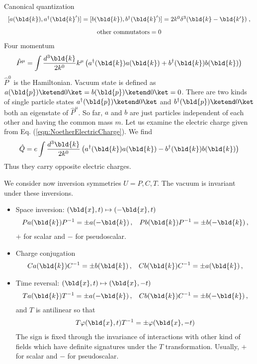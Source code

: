 Canonical quantization
\begin{equation}
\begin{array}{c}
[ a(\bld{k}), a^\dagger(\bld{k}')] = 
[ b(\bld{k}), b^\dagger(\bld{k}')] = 
2k^0\delta^3 (\bld{k} - \bld{k'} )\;,
\vspace{3mm}
\\
\mbox{other commutators} = 0
\label{eqn:complscalarcancomm}
\end{array}
\end{equation}
Four momentum
\begin{equation}
\hat{P}^\mu = \int \frac{d^3 \bld{k}}{2k^0} k^\mu \left(
a^\dagger(\bld{k}) a(\bld{k}) + b^\dagger(\bld{k}) b(\bld{k})
\right)
\label{eqn:KGcomplex_FourMomentum}
\end{equation}
$\hat{P}^0$ is the Hamiltonian.
Vacuum state is defined as $a(\bld{p}) \ketend 0 \ket = b(\bld{p}) \ketend 0 \ket =0$.
There are two kinds of single particle states $a^\dagger(\bld{p}) \ketend 0 \ket$ and
$b^\dagger(\bld{p}) \ketend 0 \ket$ both an eigenstate of $\hat{P}^\mu$.
So far, $a$ and $b$ are just particles independent of each other and having
the common mass $m$. Let us examine the electric charge given from
Eq. (\ref{eqn:NoetherElectricCharge}). We find
\begin{equation}
\hat{Q} = e \int \frac{d^3 \bld{k}}{2k^0}  \left(
a^\dagger(\bld{k}) a(\bld{k}) - b^\dagger(\bld{k}) b(\bld{k})
\right)
\label{eqn:KGcomplex_Charge}
\end{equation}
Thus they carry opposite electric charges.

We consider now inversion symmetries $U = P, C, T$. 
The vacuum is invariant under these inversions.
\begin{itemize}
\item
Space inversion:
$(\bld{x}, t) \mapsto (-\bld{x}, t)$ 
\begin{eqnarray}
P a(\bld{k}) P^{-1} = \pm a(-\bld{k})\,,
\hspace{3mm}
P b(\bld{k}) P^{-1} = \pm b(-\bld{k})\,,
\end{eqnarray}
$+$ for scalar and $-$ for pseudoscalar.
\item
Charge conjugation
\begin{eqnarray}
C a(\bld{k}) C^{-1} = \pm b(\bld{k})\,,
\hspace{3mm}
C b(\bld{k}) C^{-1} = \pm a(\bld{k})\,,
\end{eqnarray}
\item
Time reversal: $(\bld{x}, t) \mapsto (\bld{x}, -t)$ 
\begin{eqnarray}
T a(\bld{k}) T^{-1} = \pm a(-\bld{k})\,,
\hspace{3mm}
C b(\bld{k}) C^{-1} = \pm b(-\bld{k})\,,
\end{eqnarray}
and $T$ is antilinear so that
\begin{eqnarray}
T \varphi(\bld{x}, t) T^{-1} = \pm \varphi(\bld{x}, -t)
\end{eqnarray}
The sign is fixed through the invariance of interactions 
with other kind of fields which have definite signatures
under the $T$ transformation. Usually, $+$ for scalar and
$-$ for pseudoscalar.
\end{itemize}

\bigskip





